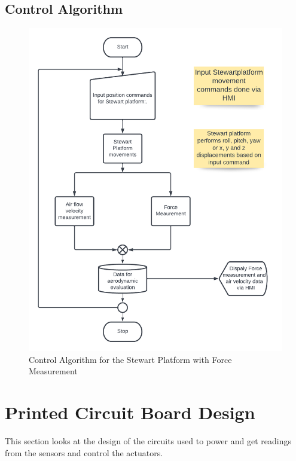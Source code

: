 \subsection{Control Algorithm}
\begin{center}
	\begin{figure}[H]
	\centering
	\includegraphics[width=0.7\linewidth]{Figures/Flow}
	\caption[Control Algorithm]{Control Algorithm for the Stewart Platform with Force Measurement}
	\end{figure}
\end{center}
\section{Printed Circuit Board Design}
This section looks at the design of the circuits used to power and get readings from the sensors and control the actuators.

